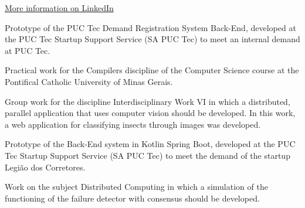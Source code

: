 \documentclass[10pt,a4paper,ragged2e,withhyper]{altacv}
\begin{document}
\begin{paracol}{2}
        {\large\color{emphasis} \href{https://www.linkedin.com/in/henriquemcc/details/certifications/}{More information on LinkedIn}}
        
        

            Prototype of the PUC Tec Demand Registration System Back-End, developed at the PUC Tec Startup Support Service (SA PUC Tec) to meet an internal demand at PUC Tec.\\
            \divider

            Practical work for the Compilers discipline of the Computer Science course at the Pontifical Catholic University of Minas Gerais.\\
            \divider

            Group work for the discipline Interdisciplinary Work VI in which a distributed, parallel application that uses computer vision should be developed. In this work, a web application for classifying insects through images was developed.\\
            \divider

            Prototype of the Back-End system in Kotlin Spring Boot, developed at the PUC Tec Startup Support Service (SA PUC Tec) to meet the demand of the startup Legião dos Corretores.\\
            \divider

            Work on the subject Distributed Computing in which a simulation of the functioning of the failure detector with consensus should be developed.\\
            \divider


\end{paracol}
\end{document}
